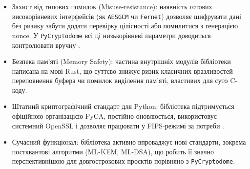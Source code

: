 \begin{itemize}
    \item Захист від типових помилок (Misuse-resistance): наявність готових високорівневих інтерфейсів (як \texttt{AESGCM} чи \texttt{Fernet}) дозволяє шифрувати дані без ризику забути додати перевірку цілісності або помилитися з генерацією nonce. У \texttt{PyCryptodome} всі ці низькорівневі параметри доводиться контролювати вручну \cite{PyCryptodome}.
    \item Безпека пам'яті (Memory Safety): частина внутрішніх модулів бібліотеки написана на мові Rust, що суттєво знижує ризик класичних вразливостей переповнення буфера чи помилок виділення пам'яті, властивих для суто C-коду.
    \item Штатний криптографічний стандарт для Python: бібліотека підтримується офіційною організацією PyCA, постійно оновлюється, використовує системний OpenSSL і дозволяє працювати у FIPS-режимі за потреби \cite{cryptography git}.
    \item Сучасний функціонал: бібліотека активно впроваджує нові стандарти, зокрема постквантові алгоритми (ML-KEM, ML-DSA), що робить її значно перспективнішою для довгострокових проєктів порівняно з \texttt{PyCryptodome}.
\end{itemize}
